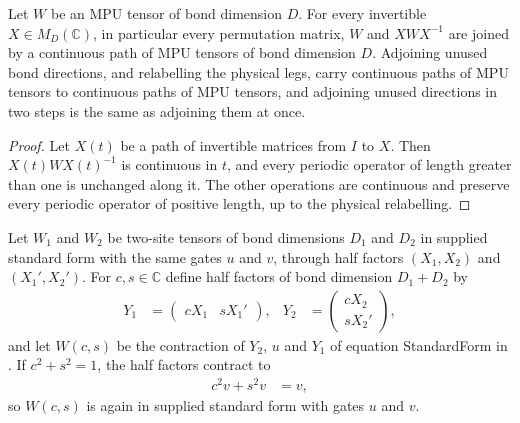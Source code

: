 \begin{lemma}
    \label{lem:mpu_gauge_padding_paths}
    \leanok
    Let $W$ be an MPU tensor of bond dimension $D$. For every invertible
    $X\in M_D(\mathbb C)$, in particular every permutation matrix, $W$ and
    $XWX^{-1}$ are joined by a continuous path of MPU tensors of bond
    dimension $D$. Adjoining unused bond directions, and relabelling the
    physical legs, carry continuous paths of MPU tensors to continuous paths
    of MPU tensors, and adjoining unused directions in two steps is the same
    as adjoining them at once.
\end{lemma}
\begin{proof}
    \leanok
    Let $X(t)$ be a path of invertible matrices from $I$ to $X$. Then
    $X(t)WX(t)^{-1}$ is continuous in $t$, and every periodic operator of
    length greater than one is unchanged along it. The other operations are
    continuous and preserve every periodic operator of positive length, up to
    the physical relabelling.
\end{proof}

\begin{definition}
    \label{def:mpu_stacked_half_factors}
    \leanok
    Let $W_1$ and $W_2$ be two-site tensors of bond dimensions $D_1$ and
    $D_2$ in supplied standard form with the same gates $u$ and $v$, through
    half factors $(X_1,X_2)$ and $(X_1',X_2')$. For $c,s\in\mathbb C$ define
    half factors of bond dimension $D_1+D_2$ by
    \begin{align}
        Y_1 & =\begin{pmatrix}cX_1 & sX_1'\end{pmatrix},  &
        Y_2 & =\begin{pmatrix}cX_2 \\ sX_2'\end{pmatrix},
    \end{align}
    and let $W(c,s)$ be the contraction of $Y_2$, $u$ and $Y_1$ of
    equation StandardForm in \cite[lines~603--617]{Cirac2017MPU}. If
    $c^2+s^2=1$, the half factors contract to
    \begin{align}
        c^2v+s^2v & =v,
    \end{align}
    so $W(c,s)$ is again in supplied standard form with gates $u$ and $v$.
\end{definition}

